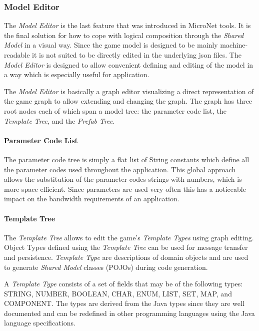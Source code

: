 \subsubsection{Model Editor}

The \textit{Model Editor} is the last feature that was introduced in MicroNet
tools. It is the final solution for how to cope with logical \ms{} composition
through the \textit{Shared Model} in a visual way. Since the game model is
designed to be mainly machine-readable it is not suited to be directly edited in
the underlying \gls{json} files. The \textit{Model Editor} is designed to allow
convenient defining and editing of the model in a way which is especially useful
for \og{} application.

The \textit{Model Editor} is basically a graph editor visualizing a direct
representation of the game graph to allow extending and changing the graph. The
graph has three root nodes each of which span a model tree: the parameter code
list, the \textit{Template Tree}, and the \textit{Prefab Tree}.

\paragraph{Parameter Code List}

The parameter code tree is simply a flat list of String constants which define
all the parameter codes used throughout the application. This global approach
allows the substitution of the parameter codes strings with numbers, which is
more space efficient. Since parameters are used very often this has a noticeable
impact on the bandwidth requirements of an application.

\paragraph{Template Tree}

The \textit{Template Tree} allows to edit the game's \textit{Template Types}
using graph editing. Object Types defined using the \textit{Template Tree} can
be used for message transfer and persistence. \textit{Template Type} are
descriptions of domain objects and are used to generate \textit{Shared Model}
classes (POJOs) during code generation.

A \textit{Template Type} consists of a set of fields that may be of the
following types: STRING, NUMBER, BOOLEAN, CHAR, ENUM, LIST, SET, MAP, and
COMPONENT. The types are derived from the Java types since they are well
documented and can be redefined in other programming languages using the Java
language specifications.

